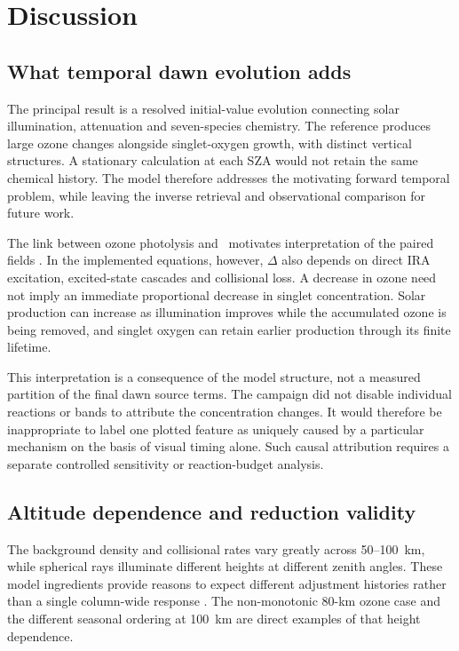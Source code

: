 \chapter{Discussion}\label{ch:discussion}
\section{What temporal dawn evolution adds}
The principal result is a resolved initial-value evolution connecting solar illumination, attenuation and seven-species chemistry. The reference produces large ozone changes alongside singlet-oxygen growth, with distinct vertical structures. A stationary calculation at each SZA would not retain the same chemical history. The model therefore addresses the motivating forward temporal problem, while leaving the inverse retrieval and observational comparison for future work.

The link between ozone photolysis and \singlet\ motivates interpretation of the paired fields \citep{li2020,mlynczak1993}. In the implemented equations, however, $\Delta$ also depends on direct IRA excitation, excited-state cascades and collisional loss. A decrease in ozone need not imply an immediate proportional decrease in singlet concentration. Solar production can increase as illumination improves while the accumulated ozone is being removed, and singlet oxygen can retain earlier production through its finite lifetime.

This interpretation is a consequence of the model structure, not a measured partition of the final dawn source terms. The campaign did not disable individual reactions or bands to attribute the concentration changes. It would therefore be inappropriate to label one plotted feature as uniquely caused by a particular mechanism on the basis of visual timing alone. Such causal attribution requires a separate controlled sensitivity or reaction-budget analysis.

\section{Altitude dependence and reduction validity}
The background density and collisional rates vary greatly across 50--100~km, while spherical rays illuminate different heights at different zenith angles. These model ingredients provide reasons to expect different adjustment histories rather than a single column-wide response \citep{brasseur2005}. The non-monotonic 80-km ozone case and the different seasonal ordering at 100~km are direct examples of that height dependence.

